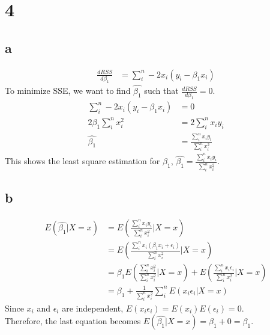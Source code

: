 \documentclass[11pt,letterpaper]{article}
\begin{document}
\newpage
\section*{4}
\subsection*{a}
\begin{align*}
\frac{d RSS}{d \beta_1} &= \sum_i^n -2 x_i (y_i - \beta_1 x_i)
\end{align*}
\noindent To minimize SSE, we want to find $\hat{\beta_1}$ such that $\frac{d RSS}{d \beta_1} = 0$.
\begin{align*}
\sum_i^n -2 x_i (y_i - \beta_1 x_i) &= 0 \\
2 \beta_1 \sum_i^n x_i^2 &=  2 \sum_i^n x_i y_i \\
\hat{\beta_1} &= \frac{\sum_i^n x_i y_i}{\sum_i^n x_i^2}
\end{align*}
\noindent This shows the least square estimation for $\beta_1$, $\hat{\beta_1} = \frac{\sum_i^n x_i y_i}{\sum_i^n x_i^2}$.

\subsection*{b}
\begin{align*}
E(\hat{\beta_1} | X=x) &= E(\frac{\sum_i^n x_i y_i}{\sum_i^n x_i^2} | X=x) \\
&= E( \frac{\sum_i^n x_i (\beta_1 x_i + \epsilon_i)}{\sum_i^n x_i^2} | X=x ) \\
&= \beta_1 E(\frac{\sum_i^n x_i^2}{\sum_i^n x_i^2 } | X=x) + E(\frac{\sum_i^n x_i \epsilon_i}{\sum_i^n x_i^2 } | X=x) \\
&= \beta_1 + \frac{1}{\sum_i^n x_i^2} \sum_i^n E(x_i \epsilon_i | X=x)
\end{align*}
\noindent Since $x_i$ and $\epsilon_i$ are independent, $E(x_i \epsilon_i) = E(x_i) E(\epsilon_i) = 0$. \\

\noindent Therefore, the last equation becomes $E(\hat{\beta_1} | X=x) = \beta_1 + 0 = \beta_1$.
\end{document}
